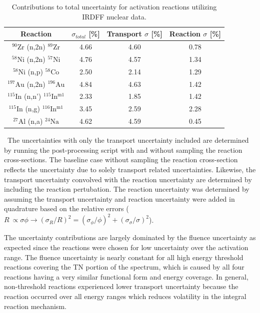 \begin{table}[htb!]
	\centering
	\caption{Contributions to total uncertainty for activation reactions utilizing IRDFF nuclear data.}
	\label{table:contributions}
	\setlength\extrarowheight{2.5pt}
	\begin{tabular}{|c|c|c|c|}
		\hline
		\textbf{Reaction} & \textbf{$\sigma_{total}$ {[}\%{]}} &\textbf{ Transport $\sigma$ {[}\%{]}} & \textbf{Reaction $\sigma$ {[}\%{]}} \\ \hline
		$\mathrm{^{90}Zr}$ (n,2n) $\mathrm{^{89}Zr}$ & 4.66 & 4.60 & 0.78 \\ \hline
		$\mathrm{^{58}Ni}$ (n,2n) $\mathrm{^{57}Ni}$ & 4.76 & 4.57 & 1.34 \\ \hline
		$\mathrm{^{58}Ni}$ (n,p) $\mathrm{^{58}Co}$ & 2.50 & 2.14 & 1.29 \\ \hline
		$\mathrm{^{197}Au}$ (n,2n) $\mathrm{^{196}Au}$ & 4.84 & 4.63 & 1.42 \\ \hline
		$\mathrm{^{115}In}$ (n,n') $\mathrm{^{115}In^{m1}}$ & 2.33 & 1.85 & 1.42 \\ \hline
		$\mathrm{^{115}In}$ (n,g) $\mathrm{^{116}In^{m1}}$ & 3.45 & 2.59 & 2.28 \\ \hline
		$\mathrm{^{27}Al}$ (n,a) $\mathrm{^{24}Na}$ & 4.62 & 4.59 & 0.45 \\ \hline
	\end{tabular}
\end{table}

\ The uncertainties with only the transport uncertainty included are determined by running the post-processing script with and without sampling the reaction cross-sections. The baseline case without sampling the reaction cross-section reflects the uncertainty due to solely transport related uncertainties. Likewise, the transport uncertainty convolved with the reaction uncertainty are determined by including the reaction pertubation. 
The reaction uncertainty was determined by assuming the transport uncertainty and reaction uncertainty were added in quadrature based on the relative errors ($R\: \propto \sigma\phi \rightarrow  (\sigma_{R}/R)^{2} = (\sigma_{\phi}/\phi)^{2} + (\sigma_{\sigma}/\sigma)^{2}$). 

The uncertainty contributions are largely dominated by the fluence uncertainty as expected since the reactions were chosen for low uncertainty over the activation range. 
The fluence uncertainty is nearly constant for all high energy threshold reactions covering the TN portion of the spectrum, which is caused by all four reactions having a very similar functional form and energy coverage. 
In general, non-threshold reactions experienced lower transport uncertainty because the reaction occurred over all energy ranges which reduces volatility in the integral reaction mechanism. 	
	
